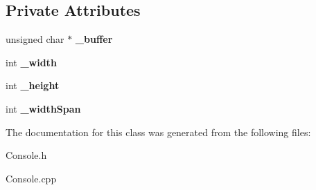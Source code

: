 \subsection*{Private Attributes}
\begin{DoxyCompactItemize}
\item 
\mbox{\label{class_v_g_a_console_driver_a338a50791acf0c153da345528d19e138}} 
unsigned char $\ast$ {\bfseries \+\_\+buffer}
\item 
\mbox{\label{class_v_g_a_console_driver_ad24705ae9815133df8eee40cc3bac8a5}} 
int {\bfseries \+\_\+width}
\item 
\mbox{\label{class_v_g_a_console_driver_a0ba908731a39a76f25dfda5f8267ff08}} 
int {\bfseries \+\_\+height}
\item 
\mbox{\label{class_v_g_a_console_driver_abfc5dcf9bb1ebcef9fcdeddc470f6c24}} 
int {\bfseries \+\_\+width\+Span}
\end{DoxyCompactItemize}


The documentation for this class was generated from the following files\+:\begin{DoxyCompactItemize}
\item 
Console.\+h\item 
Console.\+cpp\end{DoxyCompactItemize}
